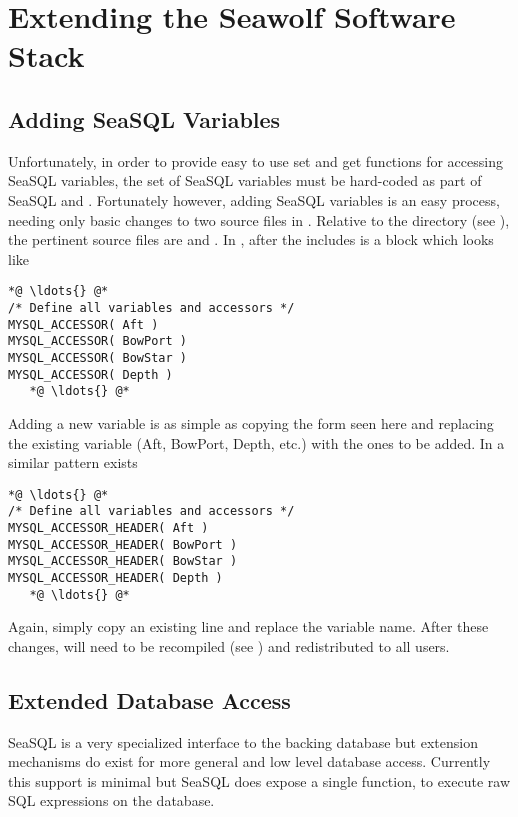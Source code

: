 
\newpage
\section{Extending the Seawolf Software Stack} \label{extending}
\subsection{Adding SeaSQL Variables} \label{extendingseasql}
Unfortunately, in order to provide easy to use set and get functions for
accessing SeaSQL variables, the set of SeaSQL variables must be hard-coded as
part of SeaSQL and \libseawolf{}. Fortunately however, adding SeaSQL variables
is an easy process, needing only basic changes to two source files in
\libseawolf{}. Relative to the  directory (see
), the pertinent source files are
 and . In ,
after the includes is a block which looks like
\begin{lstlisting}[language=Cextended, escapeinside={{*@}{@*}}, firstnumber=16]
   *@ \ldots{} @*
/* Define all variables and accessors */
MYSQL_ACCESSOR( Aft )
MYSQL_ACCESSOR( BowPort )
MYSQL_ACCESSOR( BowStar )
MYSQL_ACCESSOR( Depth )
   *@ \ldots{} @*
\end{lstlisting}
Adding a new variable is as simple as copying the form seen here and replacing
the existing variable (Aft, BowPort, Depth, etc.) with the ones to be added. In
 a similar pattern exists
\begin{lstlisting}[language=Cextended, escapeinside={{*@}{@*}}, firstnumber=26]
   *@ \ldots{} @*
/* Define all variables and accessors */
MYSQL_ACCESSOR_HEADER( Aft )
MYSQL_ACCESSOR_HEADER( BowPort )
MYSQL_ACCESSOR_HEADER( BowStar )
MYSQL_ACCESSOR_HEADER( Depth )
   *@ \ldots{} @*
\end{lstlisting}
Again, simply copy an existing line and replace the variable name. After these
changes, \libseawolf{} will need to be recompiled (see
) and redistributed to all
users.

\subsection{Extended Database Access} \label{extendingdb}
SeaSQL is a very specialized interface to the backing database but extension
mechanisms do exist for more general and low level database access. Currently
this support is minimal but SeaSQL does expose a single function,
 to execute raw SQL
expressions on the database.

